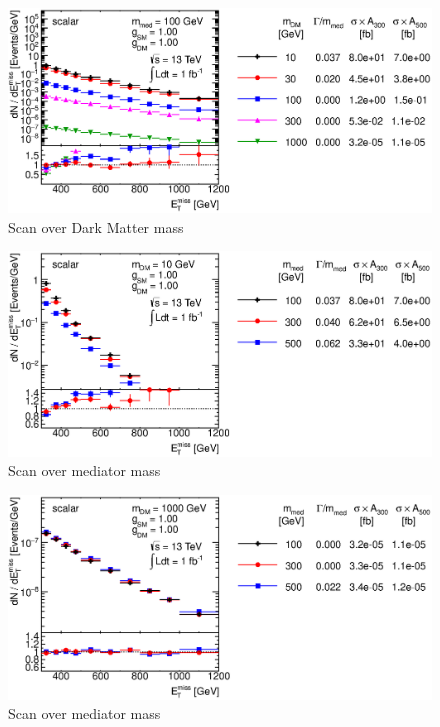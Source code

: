 \begin{figure}
\centering
\includegraphics[width=0.9\linewidth]{figures/monojet/scan_mDM_S_100.eps}
\caption{Scan over Dark Matter mass}
\label{fig:monojet_scan_S_mDM100}
\end{figure}

\begin{figure}
\centering
\includegraphics[width=0.9\linewidth]{figures/monojet/scan_mMed_S_10.eps}
\caption{Scan over mediator mass}
\label{fig:monojet_scan_S_mMed10}
\end{figure}

\begin{figure}
\centering
\includegraphics[width=0.9\linewidth]{figures/monojet/scan_mMed_S_1000.eps}
\caption{Scan over mediator mass}
\label{fig:monojet_scan_S_mMed1000}
\end{figure}


